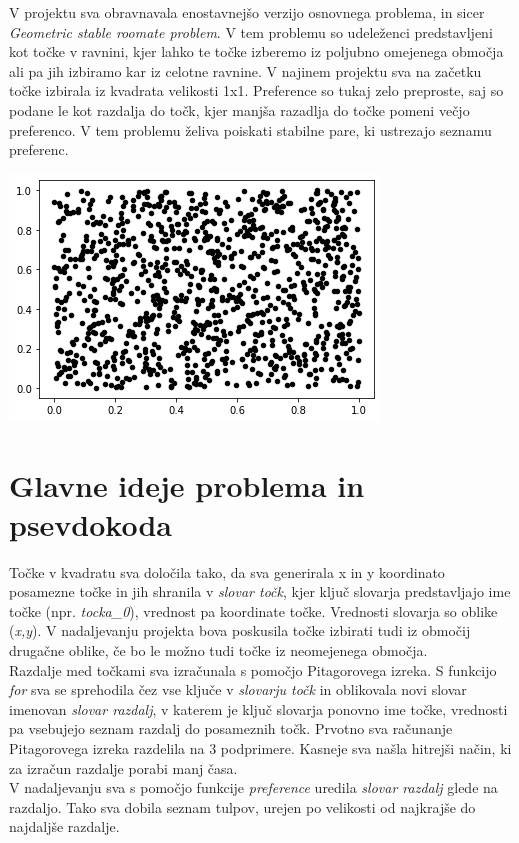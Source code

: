 \documentclass[12pt, a4paper]{article}
\begin{document}
V projektu  sva obravnavala enostavnejšo verzijo osnovnega problema, in sicer \textit{Geometric stable roomate problem}. V tem problemu so udeleženci predstavljeni kot točke v ravnini, kjer lahko te točke izberemo iz poljubno omejenega območja ali pa jih izbiramo kar iz celotne ravnine. V najinem projektu sva na začetku točke izbirala iz kvadrata velikosti 1x1. Preference so tukaj zelo preproste, saj so podane le kot razdalja do točk, kjer manjša razadlja do točke pomeni večjo preferenco. V tem problemu želiva poiskati stabilne pare, ki ustrezajo seznamu preferenc. \\

\begin{center}
\includegraphics{rdece_tocke.png}
\end{center}


\section{Glavne ideje problema in psevdokoda}
Točke v kvadratu sva določila tako, da sva generirala x in y koordinato posamezne točke in jih shranila v \textit{slovar točk}, kjer ključ slovarja predstavljajo ime točke (npr. \textit{tocka_0}), vrednost pa koordinate točke. Vrednosti slovarja so oblike (\textit{x,y}). V nadaljevanju projekta bova poskusila točke izbirati tudi iz območij drugačne oblike, če bo le možno tudi točke iz neomejenega območja.\\

Razdalje med točkami sva izračunala s pomočjo Pitagorovega izreka. S funkcijo \textit{for} sva se sprehodila čez vse ključe v \textit{slovarju točk} in oblikovala novi slovar imenovan \textit{slovar razdalj}, v katerem je ključ slovarja ponovno ime točke, vrednosti pa vsebujejo seznam razdalj do posameznih točk. Prvotno sva računanje Pitagorovega izreka  razdelila na 3 podprimere. Kasneje sva našla hitrejši način, ki za izračun razdalje porabi manj časa.\\
V nadaljevanju sva s pomočjo funkcije \textit{preference} uredila \textit{slovar razdalj} glede na razdaljo. Tako sva dobila seznam tulpov, urejen po velikosti od najkrajše do najdaljše razdalje.  \\
\end{document}
